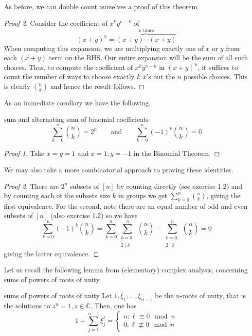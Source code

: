 \documentclass{article}
\begin{document}
As before, we can double count ourselves a proof of this theorem. 

\begin{proof}[Proof 2]
    Consider the coefficient of $x^ky^{n-k}$ of \[(x+y)^n = \overbrace{(x+y)\cdots(x+y)}^{n \text{ times}}\] When computing this expansion, 
    we are multiplying exactly one of $x$ or $y$ from each $(x+y)$ term on the RHS. Our entire expansion will be the sum of all such choices. 
    Thus, to compute the coefficient of $x^ky^{n-k}$ in $(x+y)^n$, it suffices to count the number of ways to choose exactly $k$ $x$'s out the 
    $n$ possible choices. This is clearly $\binom{n}{k}$ and hence the result follows. 
\end{proof}

As an immediate corollary we have the following.

\begin{corollary}[]{sum and alternating sum of binomial coefficients}
    \[\sum_{k=0}^n \binom{n}{k} = 2^n \qquad \text{and} \qquad \sum_{k=0}^n (-1)^k \binom{n}{k} = 0\]
\end{corollary}

\begin{proof}[Proof 1]
    Take $x=y=1$ and $x=1, y=-1$ in the Binomial Theorem. 
\end{proof}

We may also take a more combinatorial approach to proving these identities. 

\begin{proof}[Proof 2]
    There are $2^n$ subsets of $[n]$ by counting directly (see exercise 1.2) and by counting each of the subsets size $k$ in groups we get 
    $\sum_{k=0}^n \binom{n}{k}$, giving the first equivalence. For the second, note there are an equal number of odd and even subsets of $[n]$ 
    (also exercise 1.2) so we have 
    \[\sum_{k=0}^n (-1)^k \binom{n}{k} = \sum_{k=0}^n\sum_{\substack{k=0, \\ 2 \mid k}}^n \binom{n}{k} - \sum_{\substack{k=0, \\ 2 \mid k}}^{n} \binom{n}{k} = 0\]
    giving the latter equivalence.
\end{proof}

Let us recall the following lemma from (elementary) complex analysis, concerning sums of powers of roots of unity.

\begin{lemma}[]{sums of powers of roots of unity}
    Let $1, \xi_1, \dots, \xi_{n-1}$ be the $n$-roots of unity, that is the solutions to $z^n = 1, z \in \mathbb{C}$. Then, one has 
    \[1 + \sum_{j=1}^{n-1} \xi_j^\ell = \begin{cases}n : \ell \equiv 0 \mod n \\ 0 : \ell \not\equiv 0 \mod n\end{cases}\]
\end{lemma}
\end{document}
